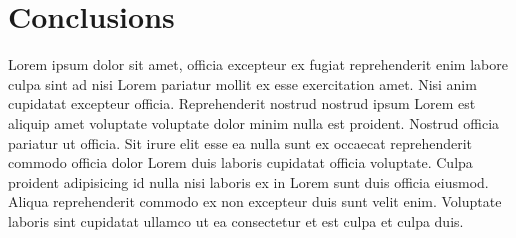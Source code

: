 \documentclass[11pt]{report}
\begin{document}
\section*{Conclusions}
Lorem ipsum dolor sit amet, officia excepteur ex fugiat reprehenderit enim labore culpa sint ad nisi
Lorem pariatur mollit ex esse exercitation amet. Nisi anim cupidatat excepteur officia.
Reprehenderit nostrud nostrud ipsum Lorem est aliquip amet voluptate voluptate dolor minim nulla est
proident. Nostrud officia pariatur ut officia. Sit irure elit esse ea nulla sunt ex occaecat
reprehenderit commodo officia dolor Lorem duis laboris cupidatat officia voluptate. Culpa proident
adipisicing id nulla nisi laboris ex in Lorem sunt duis officia eiusmod. Aliqua reprehenderit
commodo ex non excepteur duis sunt velit enim. Voluptate laboris sint cupidatat ullamco ut ea
consectetur et est culpa et culpa duis.

% 
% 
% 
% 
% 
% 
\end{document}
